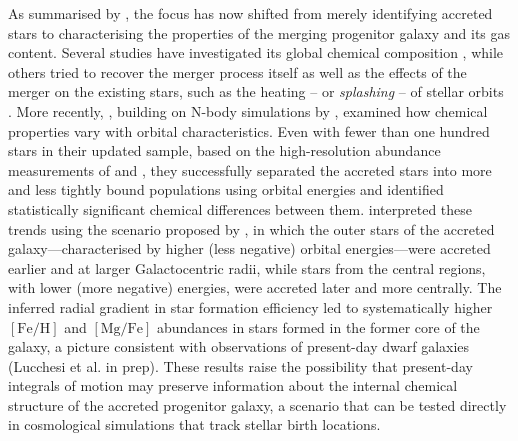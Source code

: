 \documentclass[fleqn,usenatbib]{mnras}
\newcommand{\changed}[1]{{{#1}}}
\begin{document}
As summarised by \citet{Helmi2020}, the focus has now shifted from merely identifying accreted stars to characterising the properties of the merging progenitor galaxy and its gas content. Several studies have investigated its global chemical composition \citep[for example][]{Das2020, Feuillet2021, Aguado2021, Matsuno2021, Buder2022, Belokurov2022, DeSilva2023, Monty2024, Ou2024}, while others tried to recover the merger process itself \citep[for example][]{Naidu2021} as well as the effects of the merger on the existing stars, such as the heating -- or \textit{splashing} -- of stellar orbits \citep{DiMatteo2019, Belokurov2020, Belokurov2022}. More recently, \citet{Skuladottir2025}, building on N-body simulations by \citet{Mori2024}, examined how chemical properties vary with orbital characteristics. Even with fewer than one hundred stars in their updated sample\changed{, based on the high-resolution abundance measurements of \citet{Nissen2010} and \citet{Nissen2024},} they successfully separated the accreted stars into more and less tightly bound populations using orbital energies and identified statistically significant chemical differences between them. \citet{Skuladottir2025} interpreted these trends using the scenario proposed by \citet{Mori2024}, in which the outer stars of the accreted galaxy—characterised by higher (less negative) orbital energies—were accreted earlier and at larger Galactocentric radii, while stars from the central regions, with lower (more negative) energies, were accreted later and more centrally. The inferred radial gradient in star formation efficiency led to systematically higher $\mathrm{[Fe/H]}$ and $\mathrm{[Mg/Fe]}$ abundances in stars formed in the former core of the galaxy, a picture consistent with observations of present-day dwarf galaxies (Lucchesi et al. in prep). \changed{These results raise the possibility that present-day integrals of motion may preserve information about the internal chemical structure of the accreted progenitor galaxy, a scenario that can be tested directly in cosmological simulations that track stellar birth locations.}
\end{document}
